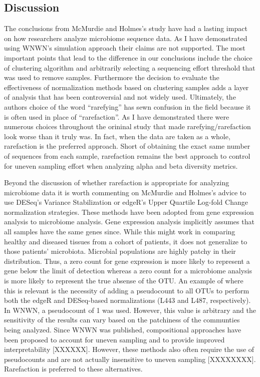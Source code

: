 \documentclass[
]{article}
\begin{document}
\hypertarget{discussion}{%
\subsection{Discussion}\label{discussion}}

The conclusions from McMurdie and Holmes's study have had a lasting
impact on how researchers analyze microbiome sequence data. As I have
demonstrated using WNWN's simulation approach their claims are not
supported. The most important points that lead to the difference in our
conclusions include the choice of clustering algorithm and arbitrarily
selecting a sequencing effort threshold that was used to remove samples.
Furthermore the decision to evaluate the effectiveness of normalization
methods based on clustering samples adds a layer of analysis that has
been controversial and not widely used. Ultimately, the authors choice
of the word ``rarefying'' has sewn confusion in the field because it is
often used in place of ``rarefaction''. As I have demonstrated there
were numerous choices throughout the orininal study that made
rarefying/rarefaction look worse than it truly was. In fact, when the
data are taken as a whole, rarefaction is the preferred approach. Short
of obtaining the exact same number of sequences from each sample,
rarefaction remains the best approach to control for uneven sampling
effort when analyzing alpha and beta diversity metrics.

Beyond the discussion of whether rarefaction is appropriate for
analyzing microbiome data it is worth commenting on McMurdie and
Holmes's advice to use DESeq's Variance Stabilization or edgeR's Upper
Quartile Log-fold Change normalization strategies. These methods have
been adopted from gene expression analysis to microbiome analysis. Gene
expression analysis implicitly assumes that all samples have the same
genes since. While this might work in comparing healthy and diseased
tissues from a cohort of patients, it does not generalize to those
patients' microbiota. Microbial populations are highly patchy in their
distribution. Thus, a zero count for gene expression is more likely to
represent a gene below the limit of detection whereas a zero count for a
microbiome analysis is more likely to represent the true absense of the
OTU. An example of where this is relevant is the necessity of adding a
pseudocount to all OTUs to perform both the edgeR and DESeq-based
normalizations (L443 and L487, respectively). In WNWN, a pseudocount of
1 was used. However, this value is arbitrary and the sensitivity of the
results can vary based on the patchiness of the communties being
analyzed. Since WNWN was published, compositional approaches have been
proposed to account for uneven sampling and to provide improved
interpretability {[}XXXXXX{]}. However, these methods also often require
the use of pseudocounts and are not actually insensitive to uneven
sampling {[}XXXXXXXX{]}. Rarefaction is preferred to these alternatives.
\end{document}
